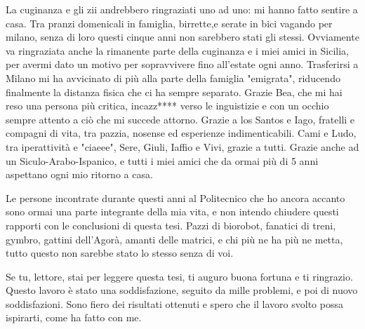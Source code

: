 La cuginanza e gli zii andrebbero ringraziati uno ad uno: mi hanno fatto sentire a casa. Tra pranzi domenicali in famiglia, birrette,e serate in bici vagando per milano, senza di loro questi cinque anni non sarebbero stati gli stessi. Ovviamente va ringraziata anche la rimanente parte della cuginanza e i miei amici in Sicilia, per avermi dato un motivo per sopravvivere fino all’estate ogni anno.
Trasferirsi a Milano mi ha avvicinato di più alla parte della famiglia "emigrata", riducendo finalmente la distanza fisica che ci ha sempre separato. Grazie Bea, che mi hai reso una persona più critica, incazz**** verso le inguistizie e con un occhio sempre attento a ciò che mi succede attorno. Grazie a los Santos e Iago, fratelli e compagni di vita, tra pazzia, nosense ed esperienze indimenticabili. Cami e Ludo, tra iperattività e "ciaeee", Sere, Giuli, Iaffio e Vivi, grazie a tutti. Grazie anche ad un Siculo-Arabo-Ispanico, e tutti i miei amici che da ormai più di 5 anni aspettano ogni mio ritorno a casa.  

Le persone incontrate durante questi anni al Politecnico che ho ancora accanto sono ormai una parte integrante della mia vita, e non intendo chiudere questi rapporti con le conclusioni di questa tesi.
Pazzi di biorobot, fanatici di treni, gymbro, gattini dell'Agorà, amanti delle matrici, e chi più ne ha più ne metta, tutto questo non sarebbe stato lo stesso senza di voi. 

Se tu, lettore, stai per leggere questa tesi, ti auguro buona fortuna e ti ringrazio. Questo lavoro è stato una soddisfazione, seguito da mille problemi, e poi di nuovo soddisfazioni. Sono fiero dei risultati ottenuti e spero che il lavoro svolto possa ispirarti, come ha fatto con me.

